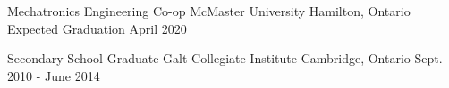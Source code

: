 
\begin{cventries}

  \cventry
    {Mechatronics Engineering Co-op} %
    {McMaster University} %
    {Hamilton, Ontario} %
    {Expected Graduation April 2020} %
    {}

\cventry
    {Secondary School Graduate} %
    {Galt Collegiate Institute} %
    {Cambridge, Ontario} %
    {Sept. 2010 - June 2014} %
    {}


\end{cventries}

